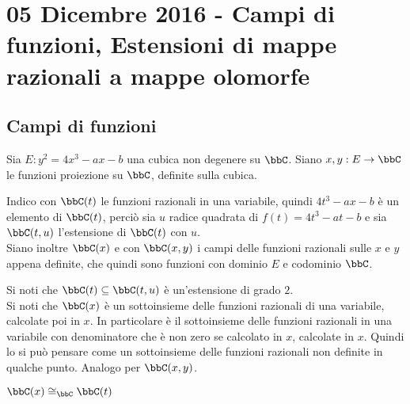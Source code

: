 
\chapter{05 Dicembre 2016 - Campi di funzioni, Estensioni di mappe razionali a mappe olomorfe}
\justify

\section{Campi di funzioni}

Sia $E: y^2=4x^3-ax-b$ una cubica non degenere su $\bbC$.
Siano $x,y:E\rightarrow\bbC$ le funzioni proiezione su $\bbC$, definite sulla cubica.
\begin{definizione}
Indico con $\bbC(t)$ le funzioni razionali in una variabile, quindi $4t^3-ax-b$ è un elemento di $\bbC(t)$, perciò sia $u$ radice quadrata di $f(t)=4t^3-at-b$ e sia $\bbC(t,u)$ l'estensione di $\bbC(t)$ con $u$.\\
Siano inoltre $\bbC(x)$ e con $\bbC(x,y)$ i campi delle funzioni razionali sulle $x$ e $y$ appena definite, che quindi sono funzioni con dominio $E$ e codominio $\bbC$.
\end{definizione}

\begin{osservazione}
Si noti che $\bbC(t)\subseteq\bbC(t,u)$ è un'estensione di grado $2$.\\
Si noti che $\bbC(x)$ è un sottoinsieme delle funzioni razionali di una variabile, calcolate poi in $x$. In particolare è il sottoinsieme delle funzioni razionali in una variabile con denominatore che è non zero se calcolato in $x$, calcolate in $x$. Quindi lo si può pensare come un sottoinsieme delle funzioni razionali non definite in qualche punto.
Analogo per $\bbC(x,y)$.
\end{osservazione}

\begin{proposizione}
$\bbC(x)\cong_{\bbC}\bbC(t)$
\end{proposizione}


